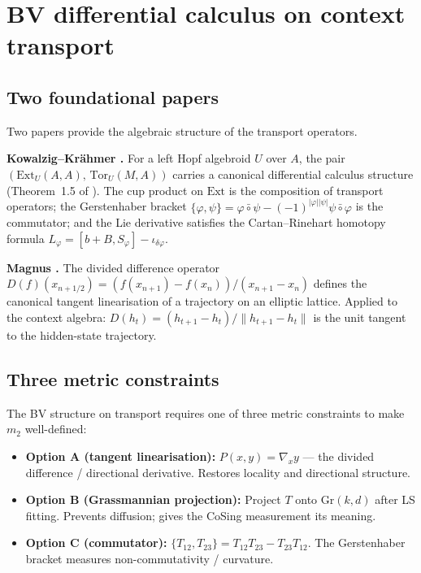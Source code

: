 \documentclass[11pt]{amsart}
\theoremstyle{definition}
\begin{document}
\section{BV differential calculus on context transport}
\label{sec:bv}

\subsection{Two foundational papers}

Two papers provide the algebraic structure of the transport operators.

\textbf{Kowalzig--Kr\"ahmer \cite{KK12}.}
For a left Hopf algebroid $U$ over $A$, the pair
$(\mathrm{Ext}_U(A,A),\, \mathrm{Tor}_U(M,A))$
carries a canonical differential calculus structure (Theorem~1.5 of \cite{KK12}).
The cup product on $\mathrm{Ext}$ is the composition of transport operators;
the Gerstenhaber bracket $\{\varphi, \psi\} = \varphi \bar\circ \psi - (-1)^{|\varphi||\psi|} \psi \bar\circ \varphi$
is the commutator; and the Lie derivative satisfies the Cartan--Rinehart homotopy formula
$L_\varphi = [b+B, S_\varphi] - \iota_{\delta\varphi}$.

\textbf{Magnus \cite{Magnus25}.}
The divided difference operator $D(f)(x_{n+1/2}) = (f(x_{n+1})-f(x_n))/(x_{n+1}-x_n)$
defines the canonical tangent linearisation of a trajectory on an elliptic lattice.
Applied to the context algebra: $D(h_t) = (h_{t+1}-h_t)/\|h_{t+1}-h_t\|$ is the
unit tangent to the hidden-state trajectory.

\subsection{Three metric constraints}

The BV structure on transport requires one of three metric constraints
to make $m_2$ well-defined:

\begin{itemize}
\item \textbf{Option A (tangent linearisation):}
  $P(x,y) = \nabla_x y$ — the divided difference / directional derivative.
  Restores locality and directional structure.
\item \textbf{Option B (Grassmannian projection):}
  Project $T$ onto $\mathrm{Gr}(k,d)$ after LS fitting.
  Prevents diffusion; gives the CoSing measurement its meaning.
\item \textbf{Option C (commutator):}
  $\{T_{12}, T_{23}\} = T_{12}T_{23} - T_{23}T_{12}$.
  The Gerstenhaber bracket measures non-commutativity / curvature.
\end{itemize}
\end{document}
